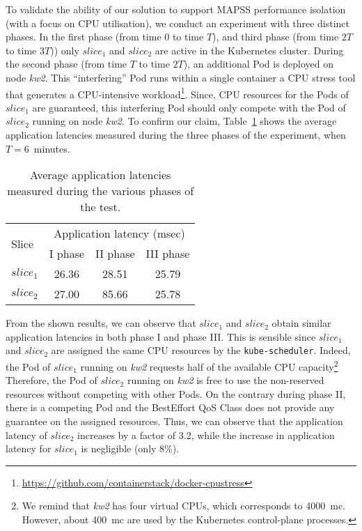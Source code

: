 %
To validate the ability of our solution to support MAPSS performance isolation (with a focus on CPU utilisation), we conduct an experiment with three distinct phases. In the first phase (from time 0 to time $T$), and third phase (from time $2T$ to time $3T$)) only $slice_1$ and $slice_2$ are active in the Kubernetes cluster. During the second phase (from time $T$ to time $2T$), an additional Pod is deployed on node \textit{kw2}. This ``interfering'' Pod runs within a single container a CPU stress tool that generates a CPU-intensive workload\footnote{\url{https://github.com/containerstack/docker-cpustress}}. Since, CPU resources for the Pods of $slice_1$ are guaranteed, this interfering Pod should only compete with the Pod of $slice_2$ running on node \textit{kw2}. To confirm our claim, Table~\ref{tab:avg_app_latency} shows the average application latencies measured during the three phases of the experiment, when $T=6$~minutes. 
%
\begin{table}[ht]
    \centering
    \small
    \begin{tabular}{|l|c|c|c|}
    \hline
         \multirow{2}{*}{Slice} &  \multicolumn{3}{|c|}{Application latency (msec)} \\\cline{2-4}
         & I phase & II phase & III phase\\
         \hline \hline
         $slice_1$ & 26.36  & 28.51 & 25.79 \\
         $slice_2$ & 27.00 & 85.66 & 25.78  \\
         \hline
    \end{tabular}
    \caption{Average application latencies measured during the various phases of the test.}
    \label{tab:avg_app_latency}
        \vspace{-0.2cm}
\end{table}
%
From the shown results, we can observe that $slice_1$ and $slice_2$ obtain similar application latencies in both phase I and phase III. This is sensible since $slice_1$ and $slice_2$ are assigned the same CPU resources by the \texttt{kube-scheduler}. Indeed, the Pod of $slice_1$ running on \textit{kw2} requests half of the available CPU capacity\footnote{We remind that \textit{kw2} has four virtual CPUs, which corresponds to 4000~mc. However, about 400~mc are used by the Kubernetes control-plane processes.} Therefore, the Pod of $slice_2$ running on \textit{kw2} is free to use the non-reserved resources without competing with other Pods. On the contrary during phase II, there is a competing Pod and the BestEffort QoS Class does not provide any guarantee on the assigned resources. Thus, we can observe that the application latency of $slice_2$ increases by a factor of 3.2, while the increase in application latency for $slice_1$ is negligible (only 8\%). 
